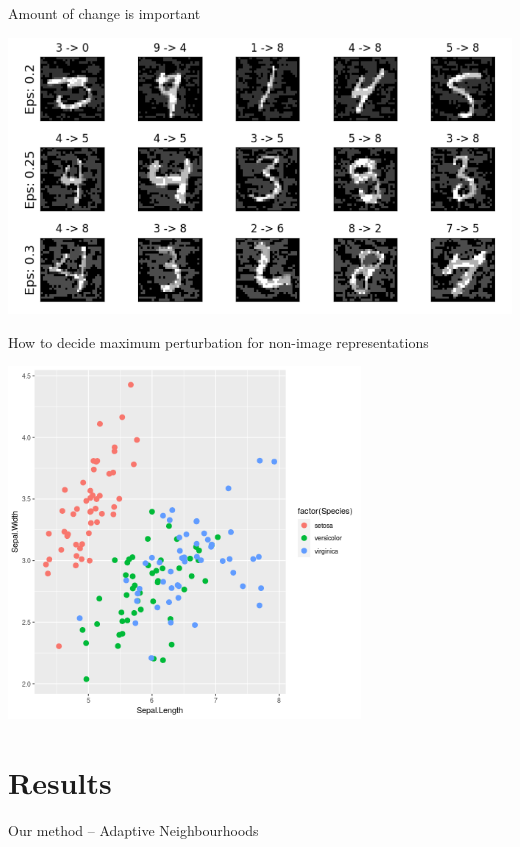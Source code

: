 \documentclass[smaller]{beamer}
\begin{document}
\begin{frame}[label={sec:orgcca2f10}]{Amount of change is important}
\begin{center}
\includegraphics[width=.9\linewidth]{images/eos.png}
\end{center}
\end{frame}

\begin{frame}[label={sec:org8d9e799}]{How to decide maximum perturbation for non-image representations}
\begin{center}
\includegraphics[width=0.7\textwidth]{images/iris.png}
\end{center}
\end{frame}

\section{Results}
\label{sec:org6f03364}

\begin{frame}[label={sec:org85f8e78},plain,c]{}
\begin{center}
\vspace{1em}\Huge Our method -- Adaptive Neighbourhoods
\end{center}
\end{frame}
\end{document}
